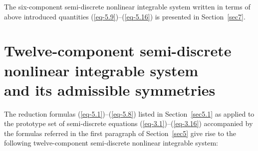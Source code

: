 \documentclass[10pt,a4paper]{amsart}
\numberwithin{equation}{section}
\begin{document}
The six-component semi-discrete nonlinear integrable system written in terms of above introduced quantities (\ref{eq-5.9})--(\ref{eq-5.16}) is presented in Section~\ref{sec7}.


\section[Twelve-component semi-discrete nonlinear integrable system and its admissible symmetries]{Twelve-component semi-discrete nonlinear integrable system\\ and its admissible symmetries}
\label{sec6}



The reduction formulas (\ref{eq-5.1})--(\ref{eq-5.8}) listed in Section~\ref{sec5.1} as applied to the prototype set of semi-discrete equations (\ref{eq-3.1})--(\ref{eq-3.16})
accompanied by the formulas referred in the first paragraph of Section~\ref{sec5} give rise to the following twelve-component semi-discrete nonlinear integrable system:
\end{document}
